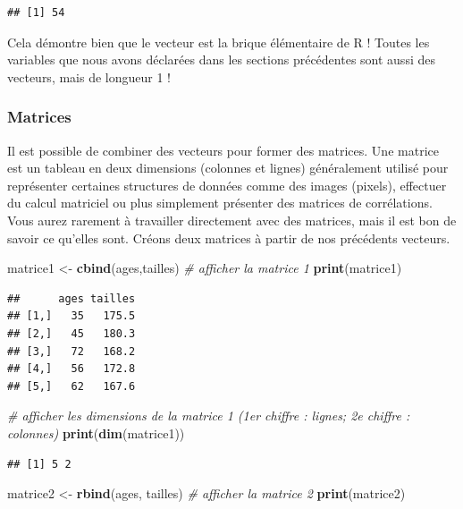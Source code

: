 \documentclass[
  11pt,
  french,
]{book}
\makeatletter
\newenvironment{Shaded}{\begin{snugshade}}{\end{snugshade}}
\newcommand{\CommentTok}[1]{\textcolor[rgb]{0.56,0.35,0.01}{\textit{#1}}}
\newcommand{\KeywordTok}[1]{\textcolor[rgb]{0.13,0.29,0.53}{\textbf{#1}}}
\newcommand{\NormalTok}[1]{#1}
\newcommand{\StringTok}[1]{\textcolor[rgb]{0.31,0.60,0.02}{#1}}
\newenvironment{kframe}{%
\medskip{}
\setlength{\fboxsep}{.8em}
 \def\at@end@of@kframe{}%
 \ifinner\ifhmode%
  \def\at@end@of@kframe{\end{minipage}}%
  \begin{minipage}{\columnwidth}%
 \fi\fi%
 \def\FrameCommand##1{\hskip\@totalleftmargin \hskip-\fboxsep
 \colorbox{shadecolor}{##1}\hskip-\fboxsep
     \hskip-\linewidth \hskip-\@totalleftmargin \hskip\columnwidth}%
 \MakeFramed {\advance\hsize-\width
   \@totalleftmargin\z@ \linewidth\hsize
   \@setminipage}}%
 {\par\unskip\endMakeFramed%
 \at@end@of@kframe}
\renewenvironment{Shaded}{\begin{kframe}}{\end{kframe}}
\makeatother
\begin{document}
\begin{verbatim}
## [1] 54
\end{verbatim}

Cela démontre bien que le vecteur est la brique élémentaire de R ! Toutes les variables que nous avons déclarées dans les sections précédentes sont aussi des vecteurs, mais de longueur 1 !

\hypertarget{sect01362}{%
\subsubsection{Matrices}\label{sect01362}}

Il est possible de combiner des vecteurs pour former des matrices. Une matrice est un tableau en deux dimensions (colonnes et lignes) généralement utilisé pour représenter certaines structures de données comme des images (pixels), effectuer du calcul matriciel ou plus simplement présenter des matrices de corrélations. Vous aurez rarement à travailler directement avec des matrices, mais il est bon de savoir ce qu'elles sont. Créons deux matrices à partir de nos précédents vecteurs.

\begin{Shaded}
\begin{Highlighting}[]
\NormalTok{matrice1 <-}\StringTok{ }\KeywordTok{cbind}\NormalTok{(ages,tailles)}
\CommentTok{# afficher la matrice 1}
\KeywordTok{print}\NormalTok{(matrice1)}
\end{Highlighting}
\end{Shaded}

\begin{verbatim}
##      ages tailles
## [1,]   35   175.5
## [2,]   45   180.3
## [3,]   72   168.2
## [4,]   56   172.8
## [5,]   62   167.6
\end{verbatim}

\begin{Shaded}
\begin{Highlighting}[]
\CommentTok{# afficher les dimensions de la matrice 1 (1er chiffre : lignes; 2e chiffre : colonnes)}
\KeywordTok{print}\NormalTok{(}\KeywordTok{dim}\NormalTok{(matrice1))}
\end{Highlighting}
\end{Shaded}

\begin{verbatim}
## [1] 5 2
\end{verbatim}

\begin{Shaded}
\begin{Highlighting}[]
\NormalTok{matrice2 <-}\StringTok{ }\KeywordTok{rbind}\NormalTok{(ages, tailles)}
\CommentTok{# afficher la matrice 2}
\KeywordTok{print}\NormalTok{(matrice2)}
\end{Highlighting}
\end{Shaded}
\end{document}
